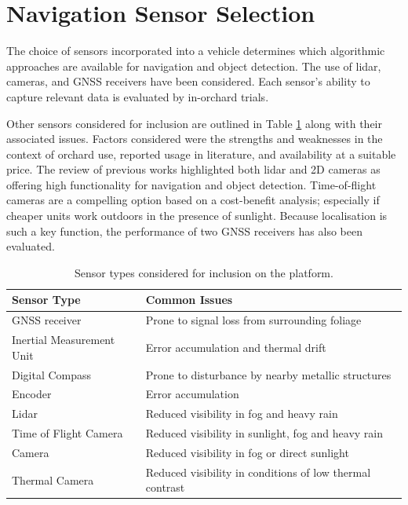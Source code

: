\documentclass[preprint,authoryear,12pt]{elsarticle}
\begin{document}
\section{Navigation Sensor Selection}
\label{sect:sensors}
    The choice of sensors incorporated into a vehicle determines which algorithmic approaches are available for navigation and object detection.
    The use of lidar, cameras, and GNSS receivers have been considered.
    Each sensor's ability to capture relevant data is evaluated by in-orchard trials.

    Other sensors considered for inclusion are outlined in Table \ref{table:sensor_comparison} along with their associated issues.
    Factors considered were the strengths and weaknesses in the context of orchard use, reported usage in literature, and availability at a suitable price.
    The review of previous works highlighted both lidar and 2D cameras as offering high functionality for navigation and object detection.
    Time-of-flight cameras are a compelling option based on a cost-benefit analysis; especially if cheaper units work outdoors in the presence of sunlight.
    Because localisation is such a key function, the performance of two GNSS receivers has also been evaluated.

    \begin{table}[htbp]
        \centering
        \footnotesize
        \begin{tabular}{ l l}

            \textbf{Sensor Type}      &\textbf{Common Issues} \\ \hline
            GNSS receiver              & Prone to signal loss from surrounding foliage\\  \hline
            Inertial Measurement Unit & Error accumulation and thermal drift\\ \hline
            Digital Compass           & Prone to disturbance by nearby metallic structures\\ \hline
            Encoder                   & Error accumulation \\ \hline
            Lidar                     & Reduced visibility in fog and heavy rain \\ \hline
            Time of Flight Camera     & Reduced visibility in sunlight, fog and heavy rain \\ \hline
            Camera                    & Reduced visibility in fog or direct sunlight \\ \hline
            Thermal Camera            & Reduced visibility in conditions of low thermal contrast\\ \hline
        \end{tabular}
        \caption{Sensor types considered for inclusion on the platform.}
        \label{table:sensor_comparison}
    \end{table}
\end{document}
